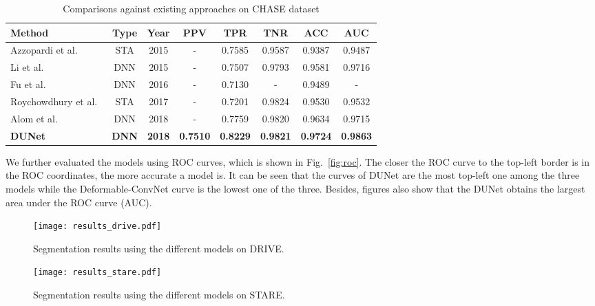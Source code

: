 \documentclass[journal]{IEEEtran}
\begin{document}
\begin{table}[]
\caption{Comparisons against existing approaches on CHASE dataset}
\renewcommand\arraystretch{1.3}      
\renewcommand\tabcolsep{1.0pt} 
\begin{center}
\begin{tabular}{lccccccc}
\toprule
Method & Type  & Year   & PPV   & TPR      & TNR   & ACC   & AUC        \\ \hline
 Azzopardi et al.~\cite{azzopardi_trainable_2015}  & STA   & 2015    & -   & 0.7585   & 0.9587 & 0.9387   & 0.9487          \\ 
 Li et al.~\cite{Li2015A} & DNN   & 2015    & -   & 0.7507   & 0.9793 & 0.9581   & 0.9716            \\
 Fu et al.~\cite{fu_deepvessel:_2016}        & DNN        & 2016     & -   & 0.7130   & -      & 0.9489   & -               \\ 
 Roychowdhury et al.~\cite{Roychowdhury2017Blood} & STA & 2017    & -    & 0.7201   & 0.9824 & 0.9530   & 0.9532          \\ 
 Alom et al.~\cite{alom_recurrent_2018}        & DNN        & 2018  & -    & 0.7759   & 0.9820 & 0.9634   & 0.9715          \\ 
 \textbf{DUNet}  & \textbf{DNN} & \textbf{2018} & \textbf{0.7510} & \textbf{0.8229} & \textbf{0.9821} & \textbf{0.9724} & \textbf{0.9863} \\ 
\bottomrule
\end{tabular}
\end{center}
\label{table:CHASE_comparisons}
\end{table}

We further evaluated the models using ROC curves, which is shown in Fig.~\ref{fig:roc}. The closer the ROC curve to the top-left border is in the ROC coordinates, the more accurate a model is. It can be seen that the curves of DUNet are the most top-left one among the three models while the Deformable-ConvNet curve is the lowest one of the three. Besides, figures also show that the DUNet obtains the largest area under the ROC curve (AUC).

\begin{figure}
\centering
\texttt{[image: results\_drive.pdf]}
\caption{Segmentation results using the different models on DRIVE.}
\label{fig:results_drive}
\end{figure}

\begin{figure}
\centering
\texttt{[image: results\_stare.pdf]}
\caption{Segmentation results using the different models on STARE.}
\label{fig:results_stare}
\end{figure}
\end{document}
